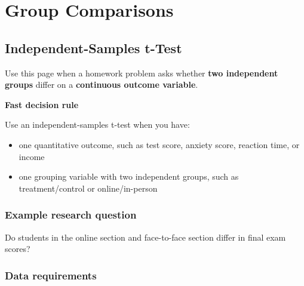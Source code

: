 \documentclass[
  letterpaper,
  DIV=11,
  numbers=noendperiod]{scrreprt}
\providecommand{\tightlist}{%
  \setlength{\itemsep}{0pt}\setlength{\parskip}{0pt}}
\begin{document}
\part{Group Comparisons}

\chapter{Independent-Samples t-Test}\label{independent-samples-t-test}

Use this page when a homework problem asks whether \textbf{two
independent groups} differ on a \textbf{continuous outcome variable}.

\begin{tcolorbox}[enhanced jigsaw, arc=.35mm, bottomrule=.15mm, breakable, colback=white, colframe=quarto-callout-tip-color-frame, left=2mm, leftrule=.75mm, opacityback=0, rightrule=.15mm, toprule=.15mm]
\begin{minipage}[t]{5.5mm}
\textcolor{quarto-callout-tip-color}{\faLightbulb}
\end{minipage}%
\begin{minipage}[t]{\textwidth - 5.5mm}

\vspace{-3mm}\textbf{Fast decision rule}\vspace{3mm}

Use an independent-samples t-test when you have:

\begin{itemize}
\tightlist
\item
  one quantitative outcome, such as test score, anxiety score, reaction
  time, or income
\item
  one grouping variable with two independent groups, such as
  treatment/control or online/in-person
\end{itemize}

\end{minipage}%
\end{tcolorbox}

\section{Example research question}\label{example-research-question}

Do students in the online section and face-to-face section differ in
final exam scores?

\section{Data requirements}\label{data-requirements-5}
\end{document}
